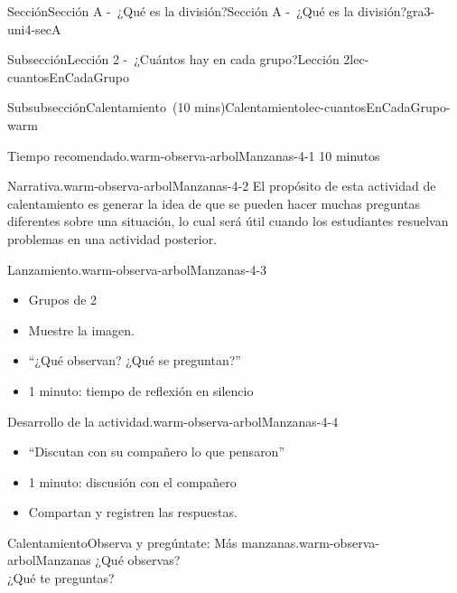 \documentclass[oneside,10pt,]{article}
\begin{document}
\begin{sectionptx}{Sección}{Sección A -~¿Qué es la división?}{}{Sección A -~¿Qué es la división?}{}{}{gra3-uni4-secA}
\begin{subsectionptx}{Subsección}{Lección 2 -~¿Cuántos hay en cada grupo?}{}{Lección 2}{}{}{lec-cuantosEnCadaGrupo}
\typeout{************************************************}
%
\begin{subsubsectionptx}{Subsubsección}{Calentamiento~(10 mins)}{}{Calentamiento}{}{}{lec-cuantosEnCadaGrupo-warm}
\par
\begin{paragraphs}{Tiempo recomendado.}{warm-observa-arbolManzanas-4-1}%
10 minutos%
\end{paragraphs}%
\begin{paragraphs}{Narrativa.}{warm-observa-arbolManzanas-4-2}%
El propósito de esta actividad de calentamiento es generar la idea de que se pueden hacer muchas preguntas diferentes sobre una situación, lo cual será útil cuando los estudiantes resuelvan problemas en una actividad posterior.%
\end{paragraphs}%
\begin{paragraphs}{Lanzamiento.}{warm-observa-arbolManzanas-4-3}%
%
\begin{itemize}[label=\textbullet]
\item{}Grupos de 2%
\item{}Muestre la imagen.%
\item{}``¿Qué observan? ¿Qué se preguntan?''%
\item{}1 minuto: tiempo de reflexión en silencio%
\end{itemize}
\end{paragraphs}%
\begin{paragraphs}{Desarrollo de la actividad.}{warm-observa-arbolManzanas-4-4}%
%
\begin{itemize}[label=\textbullet]
\item{}``Discutan con su compañero lo que pensaron''%
\item{}1 minuto: discusión con el compañero%
\item{}Compartan y registren las respuestas.%
\end{itemize}
\end{paragraphs}%
\begin{exploration}{Calentamiento}{Observa y pregúntate: Más manzanas.}{warm-observa-arbolManzanas}%
¿Qué observas?\\
 ¿Qué te preguntas?%
\begin{image}{0.15}{0.7}{0.15}{}%

\end{image}
\end{exploration}
\end{subsubsectionptx}
\end{subsectionptx}
\end{sectionptx}
\end{document}
